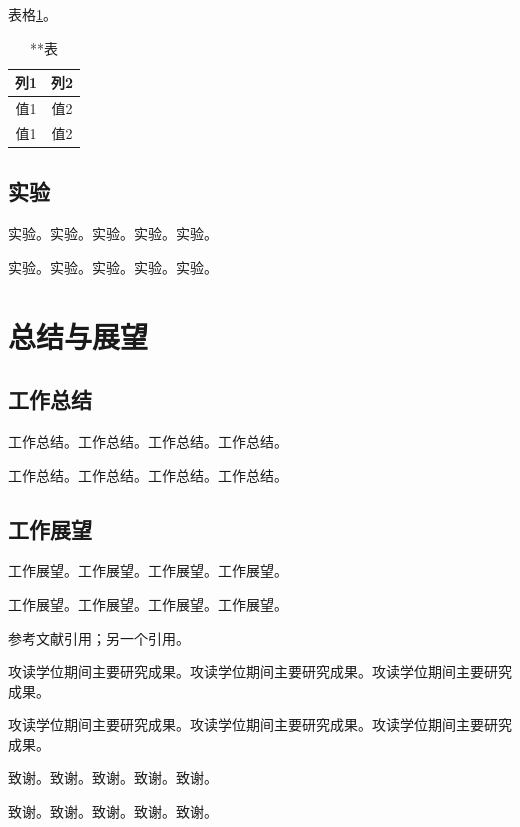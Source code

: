 \documentclass{csuthesis}
\begin{document}
    表格\ref{tab:table3}。
    \begin{table}
        \centering
        \caption{**表}
        \label{tab:table3}
        \begin{tabular}{c|c}
            \toprule[1.5bp]
            列1 & 列2 \\
            \midrule[0.75bp]
            值1 & 值2 \\
            值1 & 值2 \\
            \bottomrule[1.5bp]
        \end{tabular}
    \end{table}

    \section{实验}
    实验。实验。实验。实验。实验。

    实验。实验。实验。实验。实验。

    \chapter{总结与展望}
    \thispagestyle{mainstyle} %
    \section{工作总结}
    工作总结。工作总结。工作总结。工作总结。

    工作总结。工作总结。工作总结。工作总结。

    \section{工作展望}
    工作展望。工作展望。工作展望。工作展望。

    工作展望。工作展望。工作展望。工作展望。
    
    参考文献引用\cite{lamport1994latex}；另一个引用\cite{王夫之1977周易外传}。

    \printbibliography
    
    \achievementtitle
    
    攻读学位期间主要研究成果。攻读学位期间主要研究成果。攻读学位期间主要研究成果。

    攻读学位期间主要研究成果。攻读学位期间主要研究成果。攻读学位期间主要研究成果。
    
    \thankstitle
    
    致谢。致谢。致谢。致谢。致谢。

    致谢。致谢。致谢。致谢。致谢。
\end{document}
